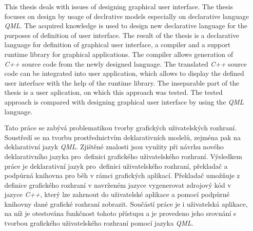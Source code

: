 \documentclass[11pt,twoside,a4paper]{book}
\begin{document}





\abstractpage

\noindent
This thesis deals with issues of designing graphical user interface.  The thesis focuses on design by usage of declrative models especially on declarative language  \textit{QML}. The acquired knowledge is used to design new declarative language for the purposes of definition of user interface. The result of the thesis is a declarative language for definition of graphical user interface, a compiler and a support runtime library for graphical applications. The compiler allows generation of \textit{C++} source code from the newly designed language. The translated \textit{C++} source code can be integrated into user application, which allows to display the defined user interface with the help of the runtime library. The inseparable part of the thesis is a user aplication, on which this approach was tested. The tested approach is compared with designing graphical user interface by using the \textit{QML} language.


\baselineskip

\noindent
Tato práce se zabývá problematikou tvorby grafických uživatelských rozhraní. Soustředí se na tvorbu prostřednictvím deklarativních modelů, zejména pak na deklarativní jazyk \textit{QML}. Zjištěné znalosti jsou využity při návrhu nového deklarativního jazyka pro~definici grafického uživatelského rozhraní. Výsledkem práce je deklarativní jazyk pro~definici uživatelského rozhraní, překladač a podpůrná knihovna pro běh v rámci grafických aplikací. Překladač umožňuje z definice grafického rozhraní v navrženém jazyce vygenerovat zdrojový kód v jazyce \textit{C++}, který lze zahrnout do uživatelské aplikace a pomocí podpůrné knihovny dané grafické rozhraní zobrazit. Součástí práce je i uživatelská aplikace, na níž je otestována funkčnost tohoto přístupu a je provedeno jeho srovnání s tvorbou grafického uživatelského rozhraní pomocí jazyka \textit{QML}.
\end{document}
